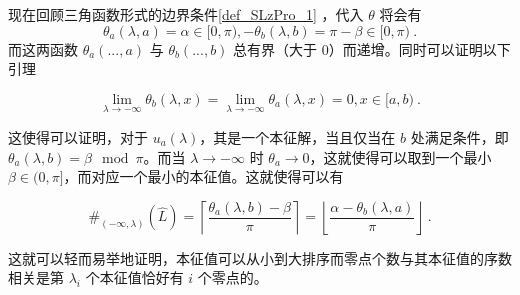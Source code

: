 现在回顾三角函数形式的边界条件\autoref{def_SLzPro_1} ，代入 $\theta$ 将会有
\begin{equation}
\theta_a(\lambda, a) = \alpha\in [0, \pi), -\theta_b(\lambda,  b) = \pi-\beta \in [0,\pi) ~.
\end{equation}
而这两函数 $\theta_a(..., a)$ 与 $\theta_b(..., b)$ 总有界（大于 $0$）而递增。同时可以证明以下引理
\begin{lemma}{}
\begin{equation}
\lim_{\lambda \rightarrow -\infty} \theta_b(\lambda, x) = \lim_{\lambda \rightarrow -\infty} \theta_a(\lambda, x) = 0, x \in [a, b) ~.
\end{equation}

\end{lemma}
这使得可以证明，对于 $u_a(\lambda)$，其是一个本征解，当且仅当在 $b$ 处满足条件，即 $\theta_a(\lambda, b) = \beta \mod \pi$。而当 $\lambda \rightarrow -\infty$ 时 $\theta_a \rightarrow 0$，这就使得可以取到一个最小 $\beta \in (0, \pi]$，而对应一个最小的本征值。这就使得可以有
\begin{theorem}{}
\begin{equation}
\#_{(-\infty, \lambda)}(\hat L) = \left\lceil \frac{\theta_a(\lambda, b) - \beta}{\pi}\right\rceil = \left\lfloor \frac{\alpha - \theta_b(\lambda, a)}{\pi}\right\rfloor~.
\end{equation}

\end{theorem}

这就可以轻而易举地证明，本征值可以从小到大排序而零点个数与其本征值的序数相关是第 $\lambda_i$ 个本征值恰好有 $i$ 个零点的。